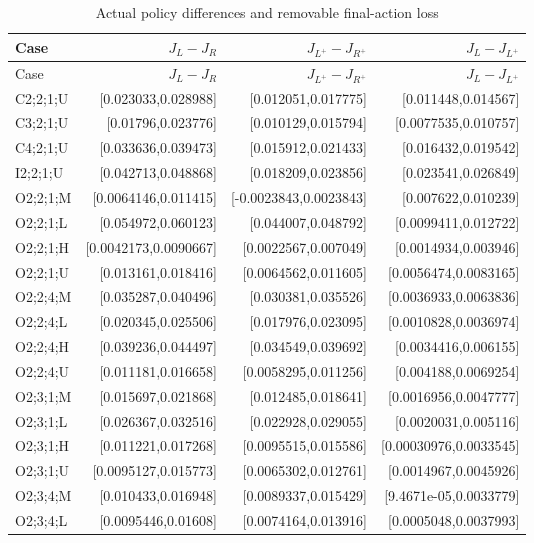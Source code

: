 {\small
\setlength{\tabcolsep}{3pt}
\begin{longtable}{@{}lrrr@{}}
\caption{Actual policy differences and removable final-action loss}\label{tab:policy50}\\
\toprule
Case & $J_L-J_R$ & $J_{L^+}-J_{R^+}$ & $J_L-J_{L^+}$ \\
\midrule
\endfirsthead
\toprule
Case & $J_L-J_R$ & $J_{L^+}-J_{R^+}$ & $J_L-J_{L^+}$ \\
\midrule
\endhead
\bottomrule
\endfoot
C2;2;1;U & [0.023033,0.028988] & [0.012051,0.017775] & [0.011448,0.014567] \\
C3;2;1;U & [0.01796,0.023776] & [0.010129,0.015794] & [0.0077535,0.010757] \\
C4;2;1;U & [0.033636,0.039473] & [0.015912,0.021433] & [0.016432,0.019542] \\
I2;2;1;U & [0.042713,0.048868] & [0.018209,0.023856] & [0.023541,0.026849] \\
O2;2;1;M & [0.0064146,0.011415] & [-0.0023843,0.0023843] & [0.007622,0.010239] \\
O2;2;1;L & [0.054972,0.060123] & [0.044007,0.048792] & [0.0099411,0.012722] \\
O2;2;1;H & [0.0042173,0.0090667] & [0.0022567,0.007049] & [0.0014934,0.003946] \\
O2;2;1;U & [0.013161,0.018416] & [0.0064562,0.011605] & [0.0056474,0.0083165] \\
O2;2;4;M & [0.035287,0.040496] & [0.030381,0.035526] & [0.0036933,0.0063836] \\
O2;2;4;L & [0.020345,0.025506] & [0.017976,0.023095] & [0.0010828,0.0036974] \\
O2;2;4;H & [0.039236,0.044497] & [0.034549,0.039692] & [0.0034416,0.006155] \\
O2;2;4;U & [0.011181,0.016658] & [0.0058295,0.011256] & [0.004188,0.0069254] \\
O2;3;1;M & [0.015697,0.021868] & [0.012485,0.018641] & [0.0016956,0.0047777] \\
O2;3;1;L & [0.026367,0.032516] & [0.022928,0.029055] & [0.0020031,0.005116] \\
O2;3;1;H & [0.011221,0.017268] & [0.0095515,0.015586] & [0.00030976,0.0033545] \\
O2;3;1;U & [0.0095127,0.015773] & [0.0065302,0.012761] & [0.0014967,0.0045926] \\
O2;3;4;M & [0.010433,0.016948] & [0.0089337,0.015429] & [9.4671e-05,0.0033779] \\
O2;3;4;L & [0.0095446,0.01608] & [0.0074164,0.013916] & [0.0005048,0.0037993] \\

\end{longtable}}
